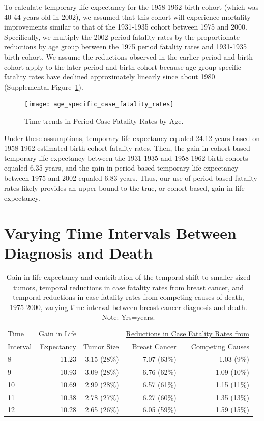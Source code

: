 \documentclass[11pt,letterpaper]{article}
\theoremstyle{plain}
\begin{document}
To calculate temporary life expectancy for the 1958-1962 birth cohort
(which was 40-44 years old in 2002), we assumed that this cohort will
experience mortality improvements similar to that of the 1931-1935
cohort between 1975 and 2000. Specifically, we multiply the 2002
period fatality rates by the proportionate reductions by age group
between the 1975 period fatality rates and 1931-1935 birth cohort.  We
assume the reductions observed in the earlier period and birth cohort
apply to the later period and birth cohort because age-group-specific
fatality rates have declined approximately linearly since about 1980
(Supplemental Figure~\ref{fig:age_specific}).
\begin{figure}[h]
\begin{center}
\texttt{[image: age\_specific\_case\_fatality\_rates]}
\caption{Time trends in Period Case Fatality Rates by Age.}
\label{fig:age_specific}
\end{center}
\end{figure} 

Under these assumptions, temporary life expectancy equaled 24.12 years
based on 1958-1962 estimated birth cohort fatality rates.  Then, the
gain in cohort-based temporary life expectancy between the 1931-1935
and 1958-1962 birth cohorts equaled 6.35 years, and the gain in
period-based temporary life expectancy between 1975 and 2002 equaled
6.83 years.  Thus, our use of period-based fatality rates likely
provides an upper bound to the true, or cohort-based, gain in life
expectancy.

\newpage
\section{Varying Time Intervals Between Diagnosis and Death}
  \begin{table}[htbp]
  \centering
\begin{tabular}{@{}l rrrr@{}}
  Time & Gain in Life & &
                                \multicolumn{2}{c}{\underline{Reductions
                                in Case Fatality Rates from}}\\
  Interval & Expectancy & Tumor Size  & Breast Cancer   & Competing Causes  \\ 
  \midrule
  8  & 11.23 & 3.15 (28\%) & 7.07 (63\%) & 1.03 (9\%) \\ 
  9  & 10.93 & 3.09 (28\%) & 6.76 (62\%) & 1.09 (10\%) \\ 
  10  & 10.69 & 2.99 (28\%) & 6.57 (61\%) & 1.15 (11\%) \\ 
  11  & 10.38 & 2.78 (27\%) & 6.27 (60\%) & 1.35 (13\%) \\ 
  12  & 10.28 & 2.65 (26\%) & 6.05 (59\%) & 1.59 (15\%) \\ 
  \bottomrule
\end{tabular}
\caption{Gain in life expectancy and contribution of the temporal shift to smaller sized tumors, temporal reductions in case fatality rates from breast cancer, and temporal reductions in case fatality rates from
  competing causes of death, 1975-2000, varying time interval between breast
  cancer diagnosis and death.  Note: Yrs=years.}
\end{table}

\newpage
{} 
\newpage
\end{document}
